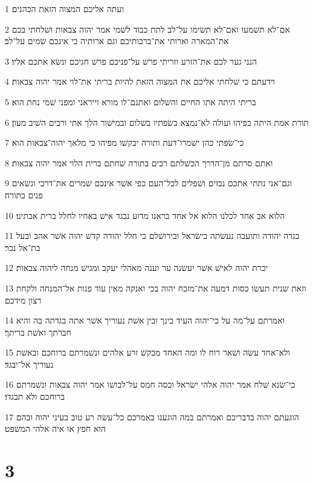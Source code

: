 \par 1 ועתה אליכם המצוה הזאת הכהנים׃
\par 2 אם־לא תשׁמעו ואם־לא תשׂימו על־לב לתת כבוד לשׁמי אמר יהוה צבאות ושׁלחתי בכם את־המארה וארותי את־ברכותיכם וגם ארותיה כי אינכם שׂמים על־לב׃
\par 3 הנני גער לכם את־הזרע וזריתי פרשׁ על־פניכם פרשׁ חגיכם ונשׂא אתכם אליו׃
\par 4 וידעתם כי שׁלחתי אליכם את המצוה הזאת להיות בריתי את־לוי אמר יהוה צבאות׃
\par 5 בריתי היתה אתו החיים והשׁלום ואתנם־לו מורא וייראני ומפני שׁמי נחת הוא׃
\par 6 תורת אמת היתה בפיהו ועולה לא־נמצא בשׂפתיו בשׁלום ובמישׁור הלך אתי ורבים השׁיב מעון׃
\par 7 כי־שׂפתי כהן ישׁמרו־דעת ותורה יבקשׁו מפיהו כי מלאך יהוה־צבאות הוא׃
\par 8 ואתם סרתם מן־הדרך הכשׁלתם רבים בתורה שׁחתם ברית הלוי אמר יהוה צבאות׃
\par 9 וגם־אני נתתי אתכם נבזים ושׁפלים לכל־העם כפי אשׁר אינכם שׁמרים את־דרכי ונשׂאים פנים בתורה׃
\par 10 הלוא אב אחד לכלנו הלוא אל אחד בראנו מדוע נבגד אישׁ באחיו לחלל ברית אבתינו׃
\par 11 בגדה יהודה ותועבה נעשׂתה בישׂראל ובירושׁלם כי חלל יהודה קדשׁ יהוה אשׁר אהב ובעל בת־אל נכר׃
\par 12 יכרת יהוה לאישׁ אשׁר יעשׂנה ער וענה מאהלי יעקב ומגישׁ מנחה ליהוה צבאות׃
\par 13 וזאת שׁנית תעשׂו כסות דמעה את־מזבח יהוה בכי ואנקה מאין עוד פנות אל־המנחה ולקחת רצון מידכם׃
\par 14 ואמרתם על־מה על כי־יהוה העיד בינך ובין אשׁת נעוריך אשׁר אתה בגדתה בה והיא חברתך ואשׁת בריתך׃
\par 15 ולא־אחד עשׂה ושׁאר רוח לו ומה האחד מבקשׁ זרע אלהים ונשׁמרתם ברוחכם ובאשׁת נעוריך אל־יבגד׃
\par 16 כי־שׂנא שׁלח אמר יהוה אלהי ישׂראל וכסה חמס על־לבושׁו אמר יהוה צבאות ונשׁמרתם ברוחכם ולא תבגדו׃
\par 17 הוגעתם יהוה בדבריכם ואמרתם במה הוגענו באמרכם כל־עשׂה רע טוב בעיני יהוה ובהם הוא חפץ או איה אלהי המשׁפט׃

\chapter{3}

